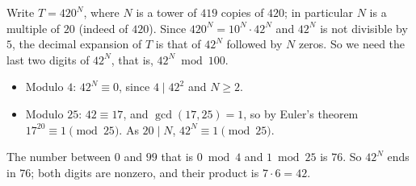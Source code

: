 Write $T=420^N$, where $N$ is a tower of $419$ copies of $420$; in particular $N$ is a multiple of $20$ (indeed of $420$). Since $420^N=10^N\cdot42^N$ and $42^N$ is not divisible by $5$, the decimal expansion of $T$ is that of $42^N$ followed by $N$ zeros. So we need the last two digits of $42^N$, that is, $42^N\bmod100$.
\begin{itemize}
\item Modulo $4$: $42^N\equiv0$, since $4\mid42^2$ and $N\ge2$.
\item Modulo $25$: $42\equiv17$, and $\gcd(17,25)=1$, so by Euler's theorem $17^{20}\equiv1\pmod{25}$. As $20\mid N$, $42^N\equiv1\pmod{25}$.
\end{itemize}
The number between $0$ and $99$ that is $0\bmod4$ and $1\bmod25$ is $76$. So $42^N$ ends in $76$; both digits are nonzero, and their product is $7\cdot6=\boxed{42}$.
